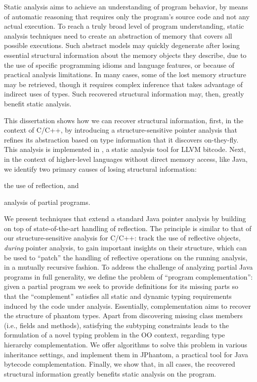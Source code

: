
Static analysis aims to achieve an understanding of program behavior,
by means of automatic reasoning that requires only the program's
source code and not any actual execution. To reach a truly broad level
of program understanding, static analysis techniques need to create an
abstraction of memory that covers all possible executions. Such
abstract models may quickly degenerate after losing essential
structural information about the memory objects they describe, due to
the use of specific programming idioms and language features, or
because of practical analysis limitations. In many cases, some of the
lost memory structure may be retrieved, though it requires complex
inference that takes advantage of indirect uses of types. Such
recovered structural information may, then, greatly benefit static
analysis.

This dissertation shows how we can recover structural information,
first, in the context of C/C++, by introducing a structure-sensitive
pointer analysis that refines its abstraction based on type
information that it discovers on-they-fly. This analysis is
implemented in \cclyzer{}, a static analysis tool for LLVM bitcode.
%
Next, in the context of higher-level languages without direct memory
access, like Java, we identify two primary causes of losing structural
information:
\begin{inparaenum}[(i)]
\item the use of reflection, and
\item analysis of partial programs.
\end{inparaenum}
We present techniques that extend a standard Java pointer analysis by
building on top of state-of-the-art handling of reflection. The
principle is similar to that of our structure-sensitive analysis for
C/C++: track the use of reflective objects, \emph{during} pointer
analysis, to gain important insights on their structure, which can be
used to ``patch'' the handling of reflective operations on the running
analysis, in a mutually recursive fashion.
%
To address the challenge of analyzing partial Java programs in full
generality, we define the problem of ``program complementation'':
given a partial program we seek to provide definitions for its missing
parts so that the ``complement'' satisfies all static and dynamic
typing requirements induced by the code under analysis. Essentially,
complementation aims to recover the structure of phantom types.  Apart
from discovering missing class members (i.e., fields and methods),
satisfying the subtyping constraints leads to the formulation of a
novel typing problem in the OO context, regarding type hierarchy
complementation. We offer algorithms to solve this problem in various
inheritance settings, and implement them in JPhantom, a practical tool
for Java bytecode complementation.
%
Finally, we show that, in all cases, the recovered structural
information greatly benefits static analysis on the program.

